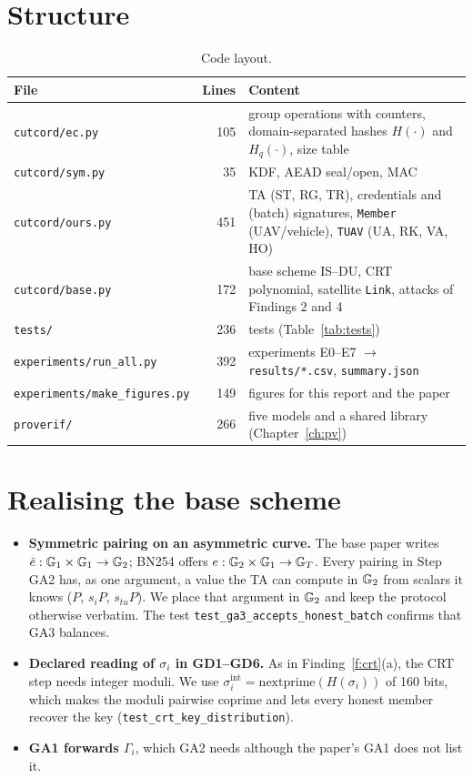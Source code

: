 \section{Structure}
\begin{table}[H]
\centering\small
\caption{Code layout.}
\begin{tabularx}{\linewidth}{@{}l r >{\raggedright\arraybackslash}X@{}}
\toprule
File & Lines & Content\\
\midrule
\texttt{cutcord/ec.py} & 105 & group operations with counters, domain-separated hashes $H(\cdot)$ and $H_q(\cdot)$, size table\\
\texttt{cutcord/sym.py} & 35 & KDF, AEAD seal/open, MAC\\
\texttt{cutcord/ours.py} & 451 & TA (ST, RG, TR), credentials and (batch) signatures, \texttt{Member} (UAV/vehicle), \texttt{TUAV} (UA, RK, VA, HO)\\
\texttt{cutcord/base.py} & 172 & base scheme IS--DU, CRT polynomial, satellite \texttt{Link}, attacks of Findings 2 and 4\\
\texttt{tests/} & 236 & 20 tests (Table~\ref{tab:tests})\\
\texttt{experiments/run\_all.py} & 392 & experiments E0--E7 $\rightarrow$ \texttt{results/*.csv}, \texttt{summary.json}\\
\texttt{experiments/make\_figures.py} & 149 & figures for this report and the paper\\
\texttt{proverif/} & 266 & five models and a shared library (Chapter~\ref{ch:pv})\\
\bottomrule
\end{tabularx}
\end{table}

\section{Realising the base scheme}
\begin{itemize}
  \item \textbf{Symmetric pairing on an asymmetric curve.} The base paper writes $\hat e:\mathbb{G}_1\times\mathbb{G}_1\to\mathbb{G}_2$; BN254 offers $e:\mathbb{G}_2\times\mathbb{G}_1\to\mathbb{G}_T$. Every
        pairing in Step GA2 has, as one argument, a value the TA can compute in $\mathbb{G}_2$ from scalars it knows ($P$, $s_iP$, $s_{tu}P$). We place that argument in
        $\mathbb{G}_2$ and keep the protocol otherwise verbatim. The test \texttt{test\_ga3\_accepts\_honest\_batch} confirms that GA3 balances.
  \item \textbf{Declared reading of $\sigma_i$ in GD1--GD6.} As in Finding~\ref{f:crt}(a), the CRT step needs integer moduli. We use
        $\sigma^{\mathrm{int}}_i=\mathrm{nextprime}(H(\sigma_i))$ of 160 bits, which makes the moduli pairwise coprime and lets every honest member recover the key
        (\texttt{test\_crt\_key\_distribution}).
  \item \textbf{GA1 forwards $\Gamma_i$}, which GA2 needs although the paper's GA1 does not list it.
\end{itemize}


